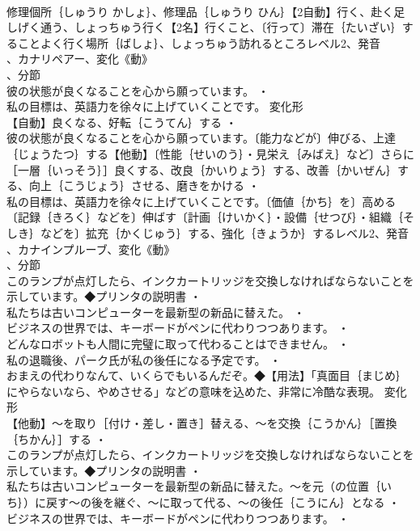 \documentclass[8pt]{extreport}
\begin{document}
\begin{CJK}{UTF8}{min}
\\	修理個所｛しゅうり かしょ｝、修理品｛しゅうり ひん｝【2自動】行く、赴く足しげく通う、しょっちゅう行く【2名】行くこと、〔行って〕滞在｛たいざい｝することよく行く場所｛ばしょ｝、しょっちゅう訪れるところレベル2、発音
\\	、カナリペアー、変化《動》
\\	、分節
\\	彼の状態が良くなることを心から願っています。 ・
\\	私の目標は、英語力を徐々に上げていくことです。	変化形 
\\	【自動】良くなる、好転｛こうてん｝する ・
\\	彼の状態が良くなることを心から願っています。〔能力などが〕伸びる、上達｛じょうたつ｝する【他動】〔性能｛せいのう｝・見栄え｛みばえ｝など〕さらに［一層｛いっそう｝］良くする、改良｛かいりょう｝する、改善｛かいぜん｝する、向上｛こうじょう｝させる、磨きをかける ・
\\	私の目標は、英語力を徐々に上げていくことです。〔価値｛かち｝を〕高める〔記録｛きろく｝などを〕伸ばす〔計画｛けいかく｝・設備｛せつび｝・組織｛そしき｝などを〕拡充｛かくじゅう｝する、強化｛きょうか｝するレベル2、発音
\\	、カナインプルーブ、変化《動》
\\	、分節
\\	このランプが点灯したら、インクカートリッジを交換しなければならないことを示しています。◆プリンタの説明書 ・
\\	私たちは古いコンピューターを最新型の新品に替えた。 ・
\\	ビジネスの世界では、キーボードがペンに代わりつつあります。 ・
\\	どんなロボットも人間に完璧に取って代わることはできません。 ・
\\	私の退職後、パーク氏が私の後任になる予定です。 ・
\\	おまえの代わりなんて、いくらでもいるんだぞ。◆【用法】「真面目｛まじめ｝にやらないなら、やめさせる」などの意味を込めた、非常に冷酷な表現。	変化形 
\\	【他動】～を取り［付け・差し・置き］替える、～を交換｛こうかん｝［置換｛ちかん｝］する ・
\\	このランプが点灯したら、インクカートリッジを交換しなければならないことを示しています。◆プリンタの説明書 ・
\\	私たちは古いコンピューターを最新型の新品に替えた。～を元（の位置｛いち｝）に戻す～の後を継ぐ、～に取って代る、～の後任｛こうにん｝となる ・
\\	ビジネスの世界では、キーボードがペンに代わりつつあります。 ・

\end{CJK}
\end{document}
